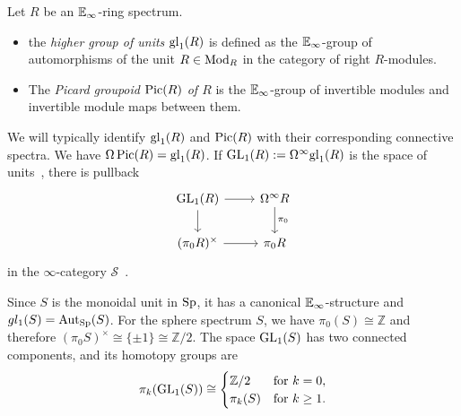 \documentclass{amsart}
\begin{document}
\begin{definition}
\label{def:units}
Let $R$ be an $\mathbb{E}_\infty$-ring spectrum.
\begin{itemize}
    \item[$\natural_1$] the \emph{higher group of units} $\mathrm{gl}_1(R)$ is defined as the $\mathbb{E}_\infty$-group of automorphisms of the unit $R \in \operatorname{Mod}_R$ in the category of right $R$-modules.
    \item[$\natural_2$] The \emph{Picard groupoid $\operatorname{Pic}(R)$ of $R$} is the $\mathbb{E}_\infty$-group of invertible modules and invertible module maps between them.
\end{itemize}
\end{definition}

We will typically identify $\mathrm{gl}_1(R)$ and $\operatorname{Pic}(R)$ with their corresponding connective spectra.
We have $\Omega \operatorname{Pic}(R) = \mathrm{gl}_1(R)$.
If $\mathrm{GL}_1(R) := \Omega^\infty \mathrm{gl}_1(R)$ is the space of units~\cite[Definition 2.1]{MR3286898}, there is pullback
\[
\begin{tikzcd}
\GL_1(R) \arrow[r] \arrow[d] & \Omega^\infty R \arrow[d, "\pi_0"] \\
(\pi_0 R)^\times \arrow[r] & \pi_0 R
\end{tikzcd}
\]
in the $\infty$-category $\mathcal{S}$~\cite[Proposition 6.2]{ando2009unitsringspectrathom}.


Since $S$ is the monoidal unit in $\operatorname{Sp}$, it has a canonical $\mathbb{E}_\infty$-structure and $gl_1(S) = \operatorname{Aut}_{\operatorname{Sp}}(S)$.
For the sphere spectrum $S$, we have $\pi_0(S) \cong \mathbb{Z}$ and therefore $(\pi_0 S)^\times \cong \{\pm 1\} \cong \mathbb{Z}/2$. The space $\mathrm{GL}_1(S)$ has two connected components, and its homotopy groups are
\[
\pi_k(\mathrm{GL}_1(S)) \cong
\begin{cases}
\mathbb{Z}/2 & \text{for } k = 0, \\
\pi_k(S) & \text{for } k \ge 1.
\end{cases}
\]
\end{document}
